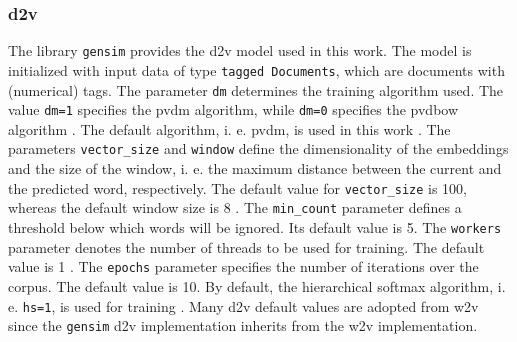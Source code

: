 \subsubsection*{\ac{d2v}}\label{subsubsec:impl-doc2vec}

The library \texttt{gensim} provides the \ac{d2v} model used in this work.
The model is initialized with input data of type \texttt{tagged Documents}, which are documents with (numerical) tags.
The parameter \texttt{dm} determines the training algorithm used.
The value \texttt{dm=1} specifies the \ac{pvdm} algorithm, while \texttt{dm=0} specifies the \ac{pvdbow} algorithm \cite{gensim-doc2vec}.
The default algorithm, i. e. \ac{pvdm}, is used in this work \cite{gensim-word2vec-init}.
The parameters \texttt{vector\_size} and \texttt{window} define the dimensionality of the embeddings and the size of the window, 
i. e. the maximum distance between the current and the predicted word, respectively.
The default value for \texttt{vector\_size} is 100, whereas the default window size is 8 \cite{gensim-word2vec-init, gensim-doc2vec-init}.
The \texttt{min\_count} parameter defines a threshold below which words will be ignored.
Its default value is 5.
The \texttt{workers} parameter denotes the number of threads to be used for training.
The default value is 1 \cite{gensim-word2vec-init}.
The \texttt{epochs} parameter specifies the number of iterations over the corpus.
The default value is 10.
By default, the hierarchical softmax algorithm, i. e. \texttt{hs=1}, is used for training \cite{gensim-doc2vec}.
Many \ac{d2v} default values are adopted from \ac{w2v} since the \texttt{gensim} \ac{d2v} implementation inherits from the \ac{w2v} implementation.
